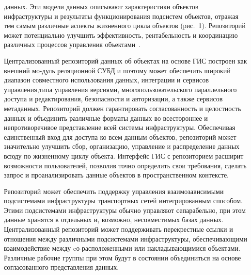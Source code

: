 \begin{multicols}{2}

\noindent
 данных. Эти модели данных описывают характеристики объектов 
инфраструктуры и результаты функционирования подсистем объектов, отражая тем 
самым различные аспекты жизненного цикла объектов (рис.~1). Репозиторий может 
потенциально улучшить эффективность, рентабельность и координацию различных 
процессов управления объектами~\cite{7dul}.
 

     
      Централизованный репозиторий данных об объектах на основе ГИС построен как 
внешний мо-\linebreak дуль реляционной СУБД и поэтому может обеспе\-чить широкий диапазон 
совместного использования данных, интеграции и сервисов управления,\linebreak типа управления 
версиями, многопользовательского параллельного доступа и редактирования, 
безопас\-ности и авторизации, а также сервисов метаданных. Репозиторий должен 
гарантировать согласованность и целостность данных и объединить различные форматы 
данных во всестороннее и непротиворечивое представление всей системы 
инфраструктуры. Обеспечивая единственный вход для доступа ко всем данным объектов, 
репозиторий может значительно улучшить сбор, организацию, управление и 
распределение данных всюду по жизненному циклу объекта. Интерфейс ГИС с 
репозиторием расширит возможности пользователей, позволив точно определить свои 
требования, сделать запрос и проанализировать данные объектов в пространственном 
контексте.
      
      Репозиторий может обеспечить поддержку управления взаимозависимыми 
подсистемами инфраструктуры транспортных сетей интегрированным способом. Этими 
подсистемами инфраструктуры обычно управляют сепарабельно, при этом данные 
хранятся в отдельных и, возможно, несовместимых базах данных. Централизованный 
репозиторий может поддерживать перекрестные ссылки и отношения между различными 
подсистемами инфраструктуры, обеспечивающими взаимодействие между 
      cо-расположенными или накладывающимися объектами. Различные рабочие 
группы при этом будут в состоянии объединиться на основе согласованного 
представления данных.
      

\end{multicols}
